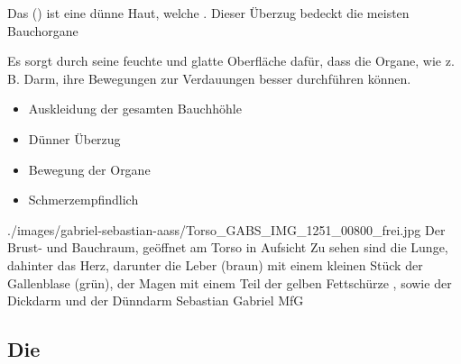 \TextSlidePicture
{\TxBeschreibung}%
{%
Das  () ist eine dünne Haut, welche
. Dieser Überzug
bedeckt die meisten Bauchorgane 

Es sorgt durch seine feuchte und glatte Oberfläche dafür,
dass die Organe, wie z.\,B. Darm, ihre Bewegungen zur
Verdauungen besser durchführen können. 
}%
{
\begin{itemize}
    \item Auskleidung der gesamten Bauchhöhle
    \item Dünner Überzug
    \item Bewegung der Organe
    \item Schmerzempfindlich
\end{itemize}}%
{./images/gabriel-sebastian-aass/Torso_GABS_IMG_1251_00800_frei.jpg}%
{Der Brust- und Bauchraum, geöffnet am Torso in Aufsicht}%
{Zu
sehen sind die Lunge, dahinter das Herz, darunter die Leber
(braun) mit einem kleinen Stück der Gallenblase (grün), der
Magen mit einem Teil der gelben Fettschürze
, sowie der Dickdarm und
der Dünndarm}%
{Sebastian Gabriel}%
{MfG}%


\subsection{Die } 


